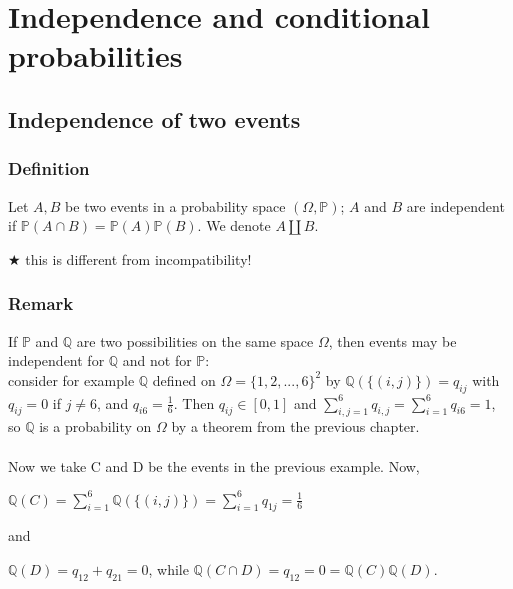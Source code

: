 \section{Independence and conditional probabilities}
        \subsection{Independence of two events}
            \subsubsection{Definition}
                Let $A,B$ be two events in a probability space $(\Omega, \mathbb{P})$; $A$ and $B$ are independent if $\mathbb{P}(A\cap B)=\mathbb{P}(A)\mathbb{P}(B)$. We denote $A\coprod B$.

            \vspace{5pt}

            $\bigstar$ this is different from incompatibility!

            \subsubsection{Remark}
                If $\mathbb{P}$ and $\mathbb{Q}$ are two possibilities on the same space $\Omega$, then events may be independent for $\mathbb{Q}$ and not for $\mathbb{P}$: \\ consider for example $\mathbb{Q}$ defined on $\Omega=\{1,2,...,6\}^2$ by $\mathbb{Q}(\{(i,j)\})=q_{ij}$ with $q_{ij}=0$ if $j\neq 6$, and $q_{i6}=\frac{1}{6}$. Then $q_{ij}\in[0,1]$ and $\displaystyle\sum_{i,j=1}^6 q_{i,j} = \sum_{i=1}^6 q_{i6}=1$, so $\mathbb{Q}$ is a probability on $\Omega$ by a theorem from the previous chapter.
                \\
                \\
                Now we take C and D be the events in the previous example. Now,
                
                \vspace{5pt}
                
                \centerline{$\mathbb{Q}(C)=\displaystyle\sum_{i=1}^6 \mathbb{Q}(\{(i,j)\}) = \sum_{i=1}^6 q_{1j}=\frac{1}{6}$}
                
                \noindent and

                \vspace{5pt}
                
                \centerline{$\mathbb{Q}(D)=q_{12}+q_{21}=0$, while $\mathbb{Q}(C\cap D)=q_{12}=0=\mathbb{Q}(C)\mathbb{Q}(D)$.}

